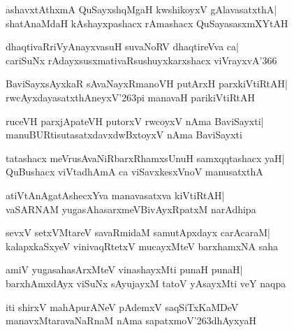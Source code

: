 \documentclass[twoside,12pt,openright]{book}
\def\S{\char'263}
\newcounter{shloka}[chapter]
\begin{document}
\begin{shloka}%
ashavxtAthxmA QuSayxshqMgaH kwshikoyxV gAlavasatxthA|\\
shatAnaMdaH kAshayxpashacx rAmashacx QuSayasasxmXYtAH
\end{shloka}

\begin{shloka}%
dhaqtivaRriVyAnayxvasuH suvaNoRV dhaqtireVva ca|\\
cariSuNx rAdayxsusxmativaRsushuyxkarxshacx viVrayxvA\char'366
\end{shloka}

\begin{shloka}%
BaviSayxsAyxkaR sAvaNayxRmanoVH putArxH parxkiVtiRtAH|\\
rwcAyxdayasatxthAneyxV\S pi manavaH parikiVtiRtAH
\end{shloka}

\begin{shloka}%
ruceVH parxjApateVH putorxV rwcoyxV nAma BaviSayxti|\\
manuBURtisutasatxdavxdwBxtoyxV nAma BaviSayxti
\end{shloka}

\begin{shloka}%
tatashacx meVrusAvaNiRbarxRhamxsUnuH samxqqtashacx yaH|\\
QuBushacx viVtadhAmA ca viSavxkesxVnoV manusatxthA
\end{shloka}

\begin{shloka}%
atiVtAnAgatAshecxYva manavasatxva kiVtiRtAH|\\
vaSARNAM yugasAhasarxmeVBivAyxRpatxM narAdhipa
\end{shloka}

\begin{shloka}%
sevxV setxVMtareV savaRmidaM samutApxdayx carAcaraM|\\
kalapxkaSxyeV vinivaqRtetxV mucayxMteV barxhamxNA saha
\end{shloka}

\begin{shloka}%
amiV yugasahasArxMteV vinashayxMti punaH punaH|\\
barxhAmxdAyx viSuNx sAyujayxM tatoV yAsayxMti veY naqpa
\end{shloka}

\begin{center}
iti shirxV mahApurANeV pAdemxV saqSiTxKaMDeV\\
 manavxMtaravaNaRnaM nAma sapatxmoV\S dhAyxyaH
\end{center}
\end{document}
